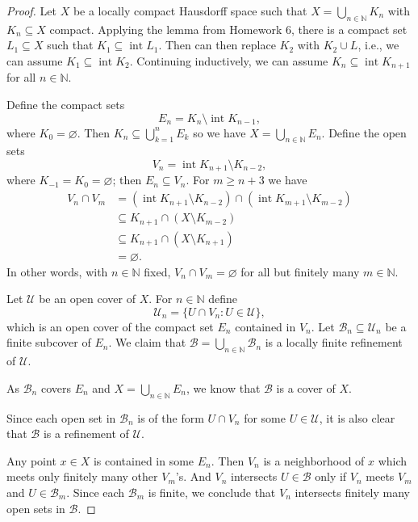 \documentclass[12pt]{article}
\theoremstyle{definition}
\newcommand{\N}{\mathbb{N}}
\renewcommand{\emptyset}{\varnothing}
\newcommand{\<}{\langle}
\renewcommand{\>}{\rangle}
\newcommand{\UU}{\mathcal{U}}
\newcommand{\BB}{\mathcal{B}}
\DeclareMathOperator{\inter}{int}
\begin{document}
\begin{proof}
    Let $X$ be a locally compact Hausdorff space such that $X = \bigcup_{n \in \N} K_n$ with $K_n \subseteq X$ compact.
    Applying the lemma from Homework 6, there is a compact set $L_1 \subseteq X$ such that $K_1 \subseteq \inter L_1$.
    Then can then replace $K_2$ with $K_2 \cup L$, i.e., we can assume $K_1 \subseteq \inter K_2$.
    Continuing inductively, we can assume $K_n \subseteq \inter K_{n+1}$ for all $n \in \N$.

    Define the compact sets
    \[
        E_n = K_n \setminus \inter K_{n-1},
    \]
    where $K_0 = \emptyset$.
    Then $K_n \subseteq \bigcup_{k=1}^{n} E_k$ so we have $X = \bigcup_{n \in \N} E_n$.
    Define the open sets
    \[
        V_n = \inter K_{n+1} \setminus K_{n-2},
    \]
    where $K_{-1} = K_0 = \emptyset$; then $E_n \subseteq V_n$. For $m \geq n+3$ we have
    \begin{align*}
        V_n \cap V_m
            &= (\inter K_{n+1} \setminus K_{n-2}) \cap (\inter K_{m+1} \setminus K_{m-2}) \\
            &\subseteq K_{n+1} \cap (X \setminus K_{m-2}) \\
            &\subseteq K_{n+1} \cap (X \setminus K_{n+1}) \\
            &= \emptyset.
    \end{align*}
    In other words, with $n \in \N$ fixed, $V_n \cap V_m = \emptyset$ for all but finitely many $m \in \N$. 

    Let $\UU$ be an open cover of $X$.
    For $n \in \N$ define
    \[
        \UU_n = \{U \cap V_n : U \in \UU\},
    \]
    which is an open cover of the compact set $E_n$ contained in $V_n$.
    Let $\BB_n \subseteq \UU_n$ be a finite subcover of $E_n$.
    We claim that $\BB = \bigcup_{n \in \N} \BB_n$ is a locally finite refinement of $\UU$.

    As $\BB_n$ covers $E_n$ and $X = \bigcup_{n \in \N} E_n$, we know that $\BB$ is a cover of $X$.

    Since each open set in $\BB_n$ is of the form $U \cap V_n$ for some $U \in \UU$, it is also clear that $\BB$ is a refinement of $\UU$.

    Any point $x \in X$ is contained in some $E_n$.
    Then $V_n$ is a neighborhood of $x$ which meets only finitely many other $V_m$'s.
    And $V_n$ intersects $U \in \BB$ only if $V_n$ meets $V_m$ and $U \in \BB_m$.
    Since each $\BB_m$ is finite, we conclude that $V_n$ intersects finitely many open sets in $\BB$.

\end{proof}
\end{document}
